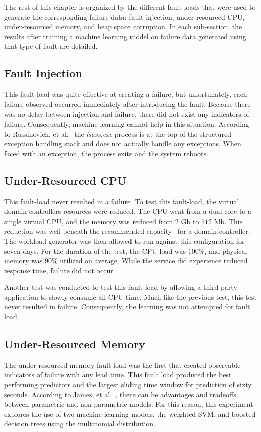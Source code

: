 The rest of this chapter is organized by the different fault loads that were
used to generate the corresponding failure data: fault injection,
under-resourced \ac{CPU}, under-resourced memory, and heap space corruption.
In each sub-section, the results after training a machine learning model on
failure data generated using that type of fault are detailed.

\subsection{Fault Injection}
This fault-load was quite effective at creating a failure, but unfortunately,
each failure observed occurred immediately after introducing the fault.
Because there was no delay between injection and failure, there did not exist
any indicators of failure.  Consequently, machine learning cannot help in this
situation.  According to Russinovich, et al.~\cite{russinovich2009} the
\emph{lsass.exe} process is at the top of the structured exception handling
stack and does not actually handle any exceptions.  When faced with an
exception, the process exits and the system reboots.

\subsection{Under-Resourced \ac{CPU}}
This fault-load never resulted in a failure.  To test this fault-load, the
virtual domain controllers resources were reduced.  The \ac{CPU} went from a
dual-core to a single virtual CPU, and the memory was reduced from $2$ Gb to
$512$ Mb.  This reduction was well beneath the recommended
capacity~\cite{mak12} for a domain controller.  The workload generator was then
allowed to run against this configuration for seven days.  For the duration of
the test, the \ac{CPU} load was $100\%$, and physical memory was $90\%$
utilized on average.  While the service did experience reduced response time,
failure did not occur.

Another test was conducted to test this fault load by allowing a third-party
application to slowly consume all \ac{CPU} time.  Much like the previous test,
this test never resulted in failure.  Consequently, the learning was not
attempted for fault load.

\subsection{Under-Resourced Memory}
The under-resourced memory fault load was the first that created observable
indicators of failure with any lead time.  This fault load produced the best
performing predictors and the largest sliding time window for prediction of
sixty seconds.  According to James, et al.~\cite{islr}, there can be advantages
and tradeoffs between parametric and non-parametric models.  For this reason,
this experiment explores the use of two machine learning models: the weighted
\ac{SVM}, and boosted decision trees using the multinomial distribution.  

